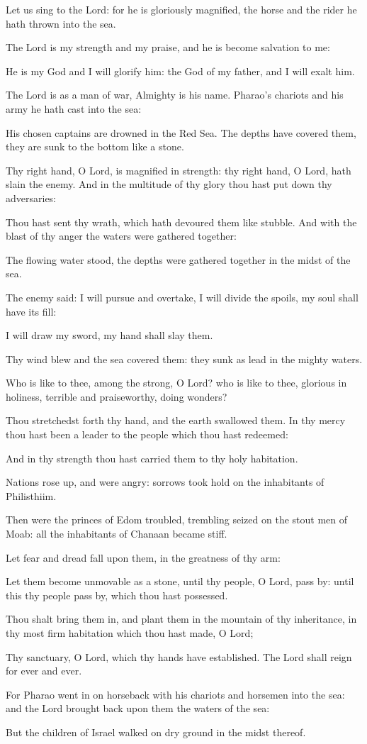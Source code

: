﻿\item Let us sing to the Lord: for he is gloriously magnified, the horse and the rider he hath thrown into the sea.
\item The Lord is my strength and my praise, and he is become salvation to me:
\item He is my God and I will glorify him: the God of my father, and I will exalt him.
\item The Lord is as a man of war, Almighty is his name. Pharao’s chariots and his army he hath cast into the sea:
\item His chosen captains are drowned in the Red Sea. The depths have covered them, they are sunk to the bottom like a stone.
\item Thy right hand, O Lord, is magnified in strength: thy right hand, O Lord, hath slain the enemy. And in the multitude of thy glory thou hast put down thy adversaries:
\item Thou hast sent thy wrath, which hath devoured them like stubble. And with the blast of thy anger the waters were gathered together:
\item The flowing water stood, the depths were gathered together in the midst of the sea.
\item The enemy said: I will pursue and overtake, I will divide the spoils, my soul shall have its fill:
\item I will draw my sword, my hand shall slay them.
\item Thy wind blew and the sea covered them: they sunk as lead in the mighty waters.
\item Who is like to thee, among the strong, O Lord? who is like to thee, glorious in holiness, terrible and praiseworthy, doing wonders?
\item Thou stretchedst forth thy hand, and the earth swallowed them. In thy mercy thou hast been a leader to the people which thou hast redeemed:
\item And in thy strength thou hast carried them to thy holy habitation.
\item Nations rose up, and were angry: sorrows took hold on the inhabitants of Philisthiim.
\item Then were the princes of Edom troubled, trembling seized on the stout men of Moab: all the inhabitants of Chanaan became stiff.
\item Let fear and dread fall upon them, in the greatness of thy arm:
\item Let them become unmovable as a stone, until thy people, O Lord, pass by: until this thy people pass by, which thou hast possessed.
\item Thou shalt bring them in, and plant them in the mountain of thy inheritance, in thy most firm habitation which thou hast made, O Lord;
\item Thy sanctuary, O Lord, which thy hands have established. The Lord shall reign for ever and ever.
\item For Pharao went in on horseback with his chariots and horsemen into the sea: and the Lord brought back upon them the waters of the sea:
\item But the children of Israel walked on dry ground in the midst thereof.